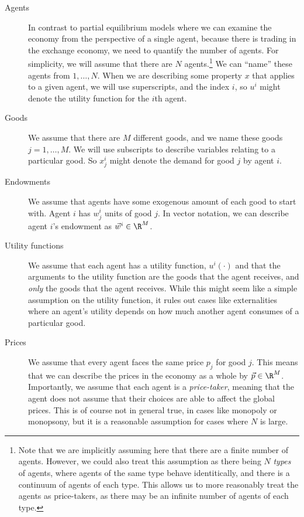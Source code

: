 \begin{description}
    \item[Agents] In contrast to partial equilibrium models where we can examine the economy from the perspective of a single agent, because there is trading in the exchange economy, we need to quantify the number of agents. For simplicity, we will assume that there are $N$ agents.\footnote{
        Note that we are implicitly assuming here that there are a finite number of agents. However, we could also treat this assumption as there being $N$ \emph{types} of agents, where agents of the same type behave identitically, and there is a continuum of agents of each type. This allows us to more reasonably treat the agents as price-takers, as there may be an infinite number of agents of each type. 
    } We can ``name'' these agents from $1, \dots, N$. When we are describing some property $x$ that applies to a given agent, we will use superscripts, and the index $i$, so $u^i$ might denote the utility function for the $i$th agent. 
    \item[Goods] We assume that there are $M$ different goods, and we name these goods $j = 1, \dots, M$. We will use subscripts to describe variables relating to a particular good. So $x^i_j$ might denote the demand for good $j$ by agent $i$. 
    \item[Endowments] We assume that agents have some exogenous amount of each good to start with. Agent $i$ has $w^i_j$ units of good $j$. In vector notation, we can describe agent $i$'s endowment as $\vec{w}^i \in \R^M$. 
    \item[Utility functions] We assume that each agent has a utility function, $u^i(\cdot)$ and that the arguments to the utility function are the goods that the agent receives, and \emph{only} the goods that the agent receives. While this might seem like a simple assumption on the utility function, it rules out cases like externalities where an agent's utility depends on how much another agent consumes of a particular good. 
    \item[Prices] We assume that every agent faces the same price $p_j$ for good $j$. This means that we can describe the prices in the economy as a whole by $\vec{p} \in \R^M$. Importantly, we assume that each agent is a \emph{price-taker}, meaning that the agent does not assume that their choices are able to affect the global prices. This is of course not in general true, in cases like monopoly or monopsony, but it is a reasonable assumption for cases where $N$ is large.     
\end{description}

